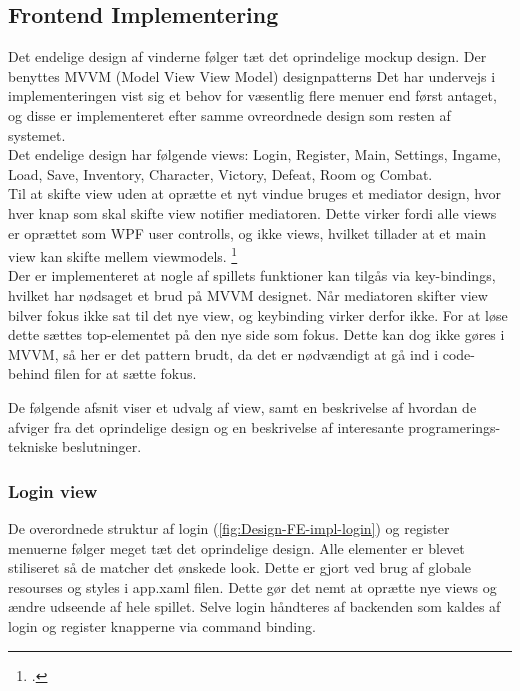\subsection{Frontend Implementering}
\label{sec:Frontend Implementering}
Det endelige design af vinderne følger tæt det oprindelige mockup design. Der benyttes MVVM (Model View View Model) designpatterns  Det har undervejs i implementeringen vist sig et behov for væsentlig flere menuer end først antaget, og disse er implementeret efter samme ovreordnede design som resten af systemet.\\
Det endelige design har følgende views: Login, Register, Main, Settings, Ingame, Load, Save, Inventory, Character, Victory, Defeat, Room og Combat.\\
Til at skifte view uden at oprætte et nyt vindue bruges et mediator design, hvor hver knap som skal skifte view notifier mediatoren. Dette virker fordi alle views er oprættet som WPF user controlls, og ikke views, hvilket tillader at et main view kan skifte mellem viewmodels. \footcite{https://www.technical-recipes.com/2018/navigating-between-views-in-wpf-mvvm/}\\

\noindent Der er implementeret at nogle af spillets funktioner kan tilgås via key-bindings, hvilket har nødsaget et brud på MVVM designet. Når mediatoren skifter view bilver fokus ikke sat til det nye view, og keybinding virker derfor ikke. For at løse dette sættes top-elementet på den nye side som fokus. Dette kan dog ikke gøres i MVVM, så her er det pattern brudt, da det er nødvændigt at gå ind i code-behind filen for at sætte fokus.

\noindent De følgende afsnit viser et udvalg af view, samt en beskrivelse af hvordan de afviger fra det oprindelige design og en beskrivelse af interesante programerings-tekniske beslutninger.

\subsubsection{Login view}
De overordnede struktur af login (\autoref{fig:Design-FE-impl-login}) og register menuerne følger meget tæt det oprindelige design. Alle elementer er blevet stiliseret så de matcher det ønskede look. Dette er gjort ved brug af globale resourses og styles i app.xaml filen. Dette gør det nemt at oprætte nye views og ændre udseende af hele spillet. Selve login håndteres af backenden som kaldes af login og register knapperne via command binding.

